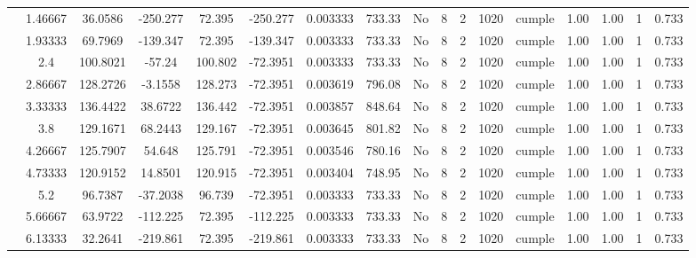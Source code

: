 \begin{table}[H]
{\begin{tabular}{|c|c|c|c|c|c|c|c|c|c|c|c|c|c|c|c|c|}
\cline{2-17}        & 1.46667 & 36.0586 & -250.277 & 72.395 & -250.277 & 0.003333 & 733.33 & No  & 8   & 2   & 1020 & \cellcolor[rgb]{ .776,  .937,  .808}cumple & 1.00 & 1.00 & 1   & 0.733 \bigstrut\\
\cline{2-17}        & 1.93333 & 69.7969 & -139.347 & 72.395 & -139.347 & 0.003333 & 733.33 & No  & 8   & 2   & 1020 & \cellcolor[rgb]{ .776,  .937,  .808}cumple & 1.00 & 1.00 & 1   & 0.733 \bigstrut\\
\cline{2-17}        & 2.4 & 100.8021 & -57.24 & 100.802 & -72.3951 & 0.003333 & 733.33 & No  & 8   & 2   & 1020 & \cellcolor[rgb]{ .776,  .937,  .808}cumple & 1.00 & 1.00 & 1   & 0.733 \bigstrut\\
\cline{2-17}        & 2.86667 & 128.2726 & -3.1558 & 128.273 & -72.3951 & 0.003619 & 796.08 & No  & 8   & 2   & 1020 & \cellcolor[rgb]{ .776,  .937,  .808}cumple & 1.00 & 1.00 & 1   & 0.733 \bigstrut\\
\cline{2-17}        & 3.33333 & 136.4422 & 38.6722 & 136.442 & -72.3951 & 0.003857 & 848.64 & No  & 8   & 2   & 1020 & \cellcolor[rgb]{ .776,  .937,  .808}cumple & 1.00 & 1.00 & 1   & 0.733 \bigstrut\\
\cline{2-17}        & 3.8 & 129.1671 & 68.2443 & 129.167 & -72.3951 & 0.003645 & 801.82 & No  & 8   & 2   & 1020 & \cellcolor[rgb]{ .776,  .937,  .808}cumple & 1.00 & 1.00 & 1   & 0.733 \bigstrut\\
\cline{2-17}        & 4.26667 & 125.7907 & 54.648 & 125.791 & -72.3951 & 0.003546 & 780.16 & No  & 8   & 2   & 1020 & \cellcolor[rgb]{ .776,  .937,  .808}cumple & 1.00 & 1.00 & 1   & 0.733 \bigstrut\\
\cline{2-17}        & 4.73333 & 120.9152 & 14.8501 & 120.915 & -72.3951 & 0.003404 & 748.95 & No  & 8   & 2   & 1020 & \cellcolor[rgb]{ .776,  .937,  .808}cumple & 1.00 & 1.00 & 1   & 0.733 \bigstrut\\
\cline{2-17}        & 5.2 & 96.7387 & -37.2038 & 96.739 & -72.3951 & 0.003333 & 733.33 & No  & 8   & 2   & 1020 & \cellcolor[rgb]{ .776,  .937,  .808}cumple & 1.00 & 1.00 & 1   & 0.733 \bigstrut\\
\cline{2-17}        & 5.66667 & 63.9722 & -112.225 & 72.395 & -112.225 & 0.003333 & 733.33 & No  & 8   & 2   & 1020 & \cellcolor[rgb]{ .776,  .937,  .808}cumple & 1.00 & 1.00 & 1   & 0.733 \bigstrut\\
\cline{2-17}        & 6.13333 & 32.2641 & -219.861 & 72.395 & -219.861 & 0.003333 & 733.33 & No  & 8   & 2   & 1020 & \cellcolor[rgb]{ .776,  .937,  .808}cumple & 1.00 & 1.00 & 1   & 0.733 \bigstrut\\

\end{tabular}}
\end{table}
